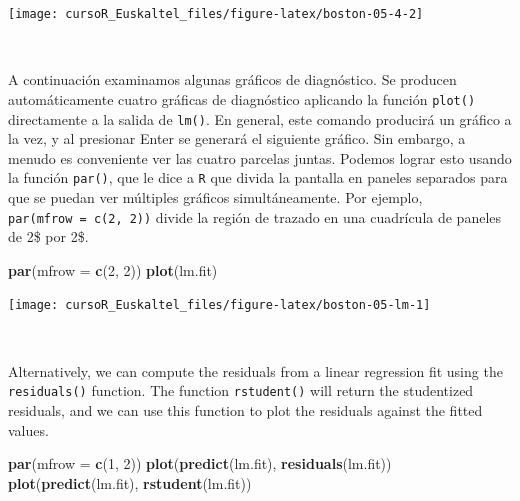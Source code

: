 \documentclass[]{book}
\newenvironment{Shaded}{\begin{snugshade}}{\end{snugshade}}
\newcommand{\KeywordTok}[1]{\textcolor[rgb]{0.13,0.29,0.53}{\textbf{#1}}}
\newcommand{\DataTypeTok}[1]{\textcolor[rgb]{0.13,0.29,0.53}{#1}}
\newcommand{\DecValTok}[1]{\textcolor[rgb]{0.00,0.00,0.81}{#1}}
\newcommand{\NormalTok}[1]{#1}
\begin{document}
\begin{center}\texttt{[image: cursoR\_Euskaltel\_files/figure-latex/boston-05-4-2]} \end{center}

~

A continuación examinamos algunas gráficos de diagnóstico. Se producen
automáticamente cuatro gráficas de diagnóstico aplicando la función
\texttt{plot()} directamente a la salida de \texttt{lm()}. En general,
este comando producirá un gráfico a la vez, y al presionar Enter se
generará el siguiente gráfico. Sin embargo, a menudo es conveniente ver
las cuatro parcelas juntas. Podemos lograr esto usando la función
\texttt{par()}, que le dice a \texttt{R} que divida la pantalla en
paneles separados para que se puedan ver múltiples gráficos
simultáneamente. Por ejemplo, \texttt{par(mfrow\ =\ c(2,\ 2))} divide la
región de trazado en una cuadrícula de paneles de 2\$ por 2\$.

\begin{Shaded}
\begin{Highlighting}[]
\KeywordTok{par}\NormalTok{(}\DataTypeTok{mfrow =} \KeywordTok{c}\NormalTok{(}\DecValTok{2}\NormalTok{, }\DecValTok{2}\NormalTok{))}
\KeywordTok{plot}\NormalTok{(lm.fit)}
\end{Highlighting}
\end{Shaded}

\begin{center}\texttt{[image: cursoR\_Euskaltel\_files/figure-latex/boston-05-lm-1]} \end{center}

~

Alternatively, we can compute the residuals from a linear regression fit
using the \texttt{residuals()} function. The function
\texttt{rstudent()} will return the studentized residuals, and we can
use this function to plot the residuals against the fitted values.

\begin{Shaded}
\begin{Highlighting}[]
\KeywordTok{par}\NormalTok{(}\DataTypeTok{mfrow =} \KeywordTok{c}\NormalTok{(}\DecValTok{1}\NormalTok{, }\DecValTok{2}\NormalTok{))}
\KeywordTok{plot}\NormalTok{(}\KeywordTok{predict}\NormalTok{(lm.fit), }\KeywordTok{residuals}\NormalTok{(lm.fit))}
\KeywordTok{plot}\NormalTok{(}\KeywordTok{predict}\NormalTok{(lm.fit), }\KeywordTok{rstudent}\NormalTok{(lm.fit))}
\end{Highlighting}
\end{Shaded}
\end{document}
